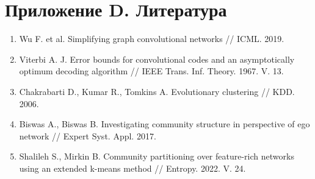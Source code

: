 \documentclass[11pt,a4paper]{article}
\providecommand{\tightlist}{\setlength{\itemsep}{1pt}\setlength{\parskip}{0pt}}
\begin{document}
\endgroup

\section*{Приложение D. Литература}\label{ux43fux440ux438ux43bux43eux436ux435ux43dux438ux435-d.-ux43bux438ux442ux435ux440ux430ux442ux443ux440ux430}

\begin{enumerate}
\def\labelenumi{\arabic{enumi}.}
\tightlist
\item
  Wu F. et al. Simplifying graph convolutional networks // ICML. 2019.
\item
  Viterbi A. J. Error bounds for convolutional codes and an asymptotically optimum decoding algorithm // IEEE Trans. Inf. Theory. 1967. V. 13.
\item
  Chakrabarti D., Kumar R., Tomkins A. Evolutionary clustering // KDD. 2006.
\item
  Biswas A., Biswas B. Investigating community structure in perspective of ego network // Expert Syst. Appl. 2017.
\item
  Shalileh S., Mirkin B. Community partitioning over feature-rich networks using an extended k-means method // Entropy. 2022. V. 24.
\end{enumerate}
\end{document}
